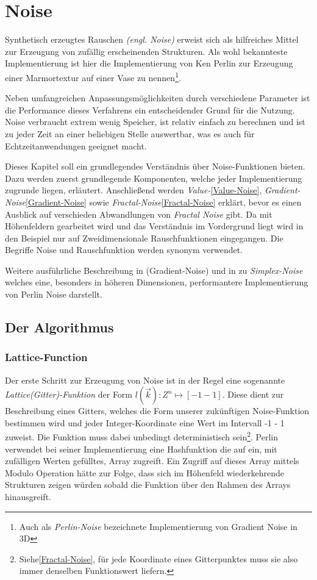 \chapter{Noise}\label{Noise}
Synthetisch erzeugtes Rauschen \emph{(engl. Noise)} erweist sich als hilfreiches Mittel zur Erzeugung von zufällig erscheinenden Strukturen.
Als wohl bekannteste Implementierung ist hier die Implementierung von Ken Perlin\cite{PERLIN1985} zur Erzeugung einer Marmortextur auf einer Vase zu nennen\footnote{Auch als \emph{Perlin-Noise} bezeichnete Implementierung von Gradient Noise in 3D}.

Neben umfangreichen Anpassungsmöglichkeiten durch verschiedene Parameter ist die Performance dieses Verfahrens ein entscheidender Grund für die Nutzung. Noise verbraucht extrem wenig Speicher, ist relativ einfach zu berechnen und ist zu jeder Zeit an einer beliebigen Stelle auswertbar, was es auch für Echtzeitanwendungen geeignet macht.\cite{H.Hauser2010}

Dieses Kapitel soll ein grundlegendes Verständnis über Noise-Funktionen bieten. Dazu werden zuerst grundlegende Komponenten, welche jeder Implementierung zugrunde liegen, erläutert. Anschließend werden \emph{Value-}\ref{Value-Noise}, \emph{Gradient-Noise}\ref{Gradient-Noise} sowie \emph{Fractal-Noise}\ref{Fractal-Noise} erklärt, bevor es einen Ausblick auf verschieden Abwandlungen von \emph{Fractal Noise} gibt. Da mit Höhenfeldern gearbeitet wird und das Verständnis im Vordergrund liegt wird in den Beispiel nur auf Zweidimensionale Rauschfunktionen eingegangen. Die Begriffe Noise und Rauschfunktion werden synonym verwendet.


Weitere ausführliche Beschreibung in \cite{BurgerGradientNoise2008} (Gradient-Noise) und in \cite{simplexNoise} zu \emph{Simplex-Noise} welches eine, besonders in höheren Dimensionen, performantere Implementierung von Perlin Noise darstellt.

\section{Der Algorithmus}
\subsection{Lattice-Function}\label{latticeFunc}
Der erste Schritt zur Erzeugung von Noise ist in der Regel eine sogenannte \emph{Lattice(Gitter)-Funktion}\cite{fractalsAndChaos} der Form \begin{math}l(\vec{k}): {Z}^n \mapsto [-1 - 1]\end{math}\label{latticeFunc}.
Diese dient zur Beschreibung eines Gitters, welches die Form unserer zukünftigen Noise-Funktion bestimmen wird und jeder Integer-Koordinate eine Wert im Intervall -1 - 1 zuweist. Die Funktion muss dabei unbedingt deterministisch sein\footnote{Siehe\ref{Fractal-Noise}, für jede Koordinate eines Gitterpunktes muss sie also immer denselben Funktionswert liefern.}. Perlin verwendet bei seiner Implementierung eine Hashfunktion die auf ein, mit zufälligen Werten gefülltes, Array zugreift.
Ein Zugriff auf dieses Array mittels Modulo Operation hätte zur Folge, dass sich im Höhenfeld wiederkehrende Strukturen zeigen würden sobald die Funktion über den Rahmen des Arrays hinausgreift.


